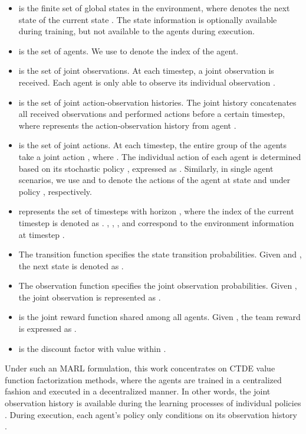 \documentclass{article}
\begin{document}
\begin{itemize}
\setlength\itemsep{0em}

\item  is the finite set of global states in the environment, where  denotes the next state of the current state . The state information is optionally available during training, but not available to the agents during execution.

\item  is the set of  agents. We use  to denote the index of the agent.

\item  is the set of joint observations. At each timestep, a joint observation  is received. Each agent  is only able to observe its individual observation .

\item  is the set of joint action-observation histories. The joint history  concatenates all received observations and performed actions before a certain timestep, where  represents the action-observation history from agent .

\item  is the set of joint actions. At each timestep, the entire group of the agents take a joint action , where . The individual action  of each agent  is determined based on its stochastic policy , expressed as . Similarly, in single agent scenarios, we use  and  to denote the actions of the agent at state  and  under policy , respectively.

\item  represents the set of timesteps with horizon , where the index of the current timestep is denoted as . , , , and  correspond to the environment information at timestep .

\item The transition function  specifies the state transition probabilities. Given  and , the next state is denoted as .

\item The observation function  specifies the joint observation probabilities. Given , the joint observation is represented as .

\item  is the joint reward function shared among all agents. Given , the team reward is expressed as .

\item  is the discount factor with value within .
\end{itemize}
Under such an MARL formulation, this work concentrates on CTDE value function factorization methods, where the agents are trained in a centralized fashion and executed in a decentralized manner. In other words, the joint observation history  is available during the learning processes of individual policies . During execution, each agent's policy  only conditions on its observation history .
\end{document}

